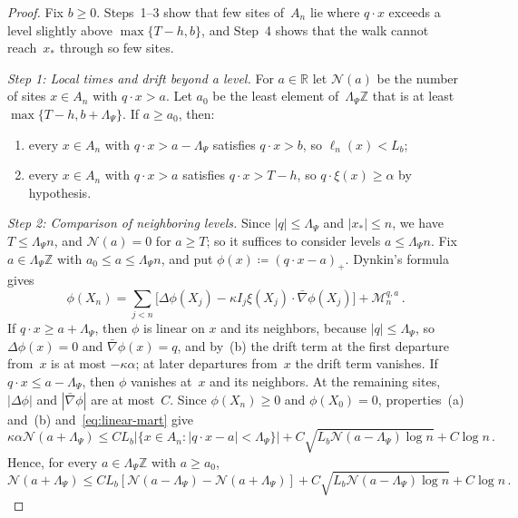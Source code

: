 \documentclass[11pt]{amsart}
\theoremstyle{plain}
\theoremstyle{definition}
\newcommand{\Z}{\mathbb Z}
\newcommand{\R}{\mathbb R}
\newcommand{\drift}{\kappa}
\newcommand{\gauge}{\Psi}
\numberwithin{equation}{section}
\begin{document}
\begin{proof}
Fix $b\geq0$. Steps~1--3 show that few sites of~$A_n$ lie where $q\cdot x$ exceeds a level slightly above $\max\{T-h,b\}$, and Step~4 shows that the walk cannot reach~$x_*$ through so few sites.

\emph{Step 1: Local times and drift beyond a level.} For $a\in\R$ let $\mathcal N(a)$ be the number of sites $x\in A_n$ with $q\cdot x>a$. Let $a_0$ be the least element of~$\Lambda_\gauge\Z$ that is at least $\max\{T-h,b+\Lambda_\gauge\}$. If $a\geq a_0$, then:
\begin{enumerate}[label=\textup{(\alph*)}]
\item every $x\in A_n$ with $q\cdot x>a-\Lambda_\gauge$ satisfies $q\cdot x>b$, so $\ell_n(x)<L_b$;
\item every $x\in A_n$ with $q\cdot x>a$ satisfies $q\cdot x>T-h$, so $q\cdot\xi(x)\geq\alpha$ by hypothesis.
\end{enumerate}

\emph{Step 2: Comparison of neighboring levels.} Since $|q|\leq\Lambda_\gauge$ and $|x_*|\leq n$, we have $T\leq\Lambda_\gauge n$, and $\mathcal N(a)=0$ for $a\geq T$; so it suffices to consider levels $a\leq\Lambda_\gauge n$. Fix $a\in\Lambda_\gauge\Z$ with $a_0\leq a\leq\Lambda_\gauge n$, and put $\phi(x)\coloneqq(q\cdot x-a)_+$. Dynkin's formula gives
\begin{equation*}
\phi(X_n)=\sum_{j<n}\bigl[\Delta\phi(X_j)-\drift I_j\xi(X_j)\cdot\bar\nabla\phi(X_j)\bigr]+\mathcal M^{q,a}_n\, .
\end{equation*}
If $q\cdot x\geq a+\Lambda_\gauge$, then $\phi$ is linear on $x$ and its neighbors, because $|q|\leq\Lambda_\gauge$, so $\Delta\phi(x)=0$ and $\bar\nabla\phi(x)=q$, and by~(b) the drift term at the first departure from~$x$ is at most $-\drift\alpha$; at later departures from~$x$ the drift term vanishes. If $q\cdot x\leq a-\Lambda_\gauge$, then $\phi$ vanishes at~$x$ and its neighbors. At the remaining sites, $|\Delta\phi|$ and $|\bar\nabla\phi|$ are at most~$C$. Since $\phi(X_n)\geq0$ and $\phi(X_0)=0$, properties~(a) and~(b) and~\eqref{eq:linear-mart} give
\begin{equation*}
\drift\alpha\mathcal N(a+\Lambda_\gauge)
\leq CL_b|\{x\in A_n:|q\cdot x-a|<\Lambda_\gauge\}|
+C\sqrt{L_b\mathcal N(a-\Lambda_\gauge)\log n}+C\log n\, .
\end{equation*}
Hence, for every $a\in\Lambda_\gauge\Z$ with $a\geq a_0$,
\begin{equation}\label{eq:norm-linear}
\mathcal N(a+\Lambda_\gauge)\leq CL_b[\mathcal N(a-\Lambda_\gauge)-\mathcal N(a+\Lambda_\gauge)]
+C\sqrt{L_b\mathcal N(a-\Lambda_\gauge)\log n}+C\log n\, .
\end{equation}


\end{proof}
\end{document}
